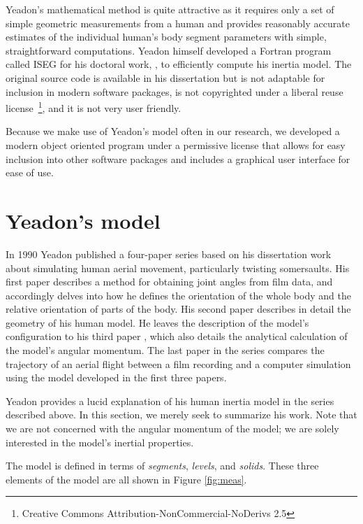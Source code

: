 \documentclass[10pt]{article}
\begin{document}
Yeadon's mathematical method is quite attractive as it requires only a set of
simple geometric measurements from a human and provides reasonably accurate
estimates of the individual human's body segment parameters with simple,
straightforward computations. Yeadon himself developed a Fortran program called
ISEG for his doctoral work, \cite{Yeadon1984a}, to efficiently compute his
inertia model. The original source code is available in his dissertation but is
not adaptable for inclusion in modern software packages, is not copyrighted
under a liberal reuse license~\footnote{Creative Commons
Attribution-NonCommercial-NoDerivs 2.5}, and it is not very user friendly.

Because we make use of Yeadon's model often in our research, we developed a
modern object oriented program under a permissive license that allows for easy
inclusion into other software packages and includes a graphical user interface
for ease of use.

\section*{Yeadon's model}

In 1990 Yeadon published a four-paper series based on his dissertation work
about simulating human aerial movement, particularly twisting somersaults. His
first paper \cite{Yeadon1990c} describes a method for obtaining joint angles
from film data, and accordingly delves into how he defines the orientation of
the whole body and the relative orientation of parts of the body. His second
paper \cite{Yeadon1990f} describes in detail the geometry of his human model.
He leaves the description of the model's configuration to his third
paper \cite{Yeadon1990e}, which also details the analytical calculation of the
model's angular momentum. The last paper in the series \cite{Yeadon1990d}
compares the trajectory of an aerial flight between a film recording and a
computer simulation using the model developed in the first three papers.

Yeadon provides a lucid explanation of his human inertia model in the series
described above. In this section, we merely seek to summarize his work. Note
that we are not concerned with the angular momentum of the model; we are solely
interested in the model's inertial properties.

The model is defined in terms of \emph{segments}, \emph{levels}, and
\emph{solids}. These three elements of the model are all shown in Figure
\ref{fig:meas}.
\end{document}
